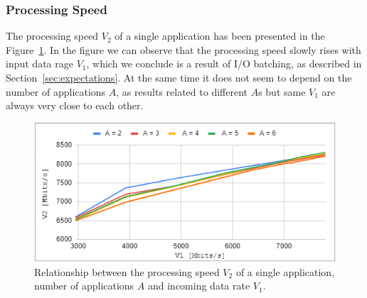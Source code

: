 \documentclass[english]{kththesis}
\begin{document}
\subsubsection{Processing Speed}
The processing speed \(V_2\) of a single application has been presented in the Figure~\ref{fig:v2result}. In the figure we can observe that the processing speed slowly rises with input data rage \(V_1\), which we conclude is a result of I/O batching, as described in Section~\ref{sec:expectations}. At the same time it does not seem to depend on the number of applications \(A\), as results related to different \(A\)s but same \(V_1\) are always very close to each other.
\begin{figure}[!ht]
  \centering
    \includegraphics[width=1\textwidth]{Fig17.png}
  \caption{Relationship between the processing speed \(V_2\) of a single application, number of applications \(A\) and incoming data rate \(V_1\).}
  \label{fig:v2result}
\end{figure}
\end{document}
